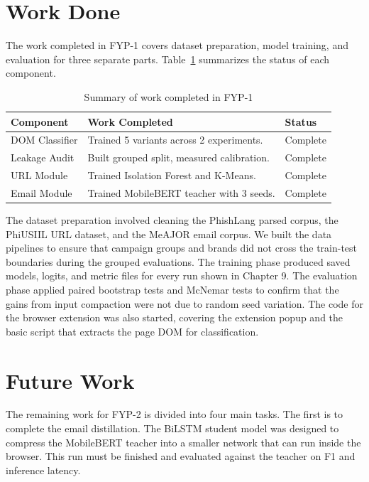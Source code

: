 \documentclass{FastFyp}
\begin{document}
\section{Work Done}
\label{sec:work-done}

The work completed in FYP-1 covers dataset preparation, model training, and evaluation for three separate parts. Table~\ref{tab:work-done} summarizes the status of each component.

\begin{table}[htbp]
\centering
\caption{Summary of work completed in FYP-1}
\label{tab:work-done}
\begin{tabular}{lll}
\hline
Component & Work Completed & Status \\
\hline
DOM Classifier & Trained 5 variants across 2 experiments. & Complete \\
Leakage Audit & Built grouped split, measured calibration. & Complete \\
URL Module & Trained Isolation Forest and K-Means. & Complete \\
Email Module & Trained MobileBERT teacher with 3 seeds. & Complete \\
\hline
\end{tabular}
\end{table}

The dataset preparation involved cleaning the PhishLang parsed corpus, the PhiUSIIL URL dataset, and the MeAJOR email corpus. We built the data pipelines to ensure that campaign groups and brands did not cross the train-test boundaries during the grouped evaluations. The training phase produced saved models, logits, and metric files for every run shown in Chapter 9. The evaluation phase applied paired bootstrap tests and McNemar tests to confirm that the gains from input compaction were not due to random seed variation. The code for the browser extension was also started, covering the extension popup and the basic script that extracts the page DOM for classification.

\section{Future Work}
\label{sec:future-work}

The remaining work for FYP-2 is divided into four main tasks. The first is to complete the email distillation. The BiLSTM student model was designed to compress the MobileBERT teacher into a smaller network that can run inside the browser. This run must be finished and evaluated against the teacher on F1 and inference latency.
\end{document}
